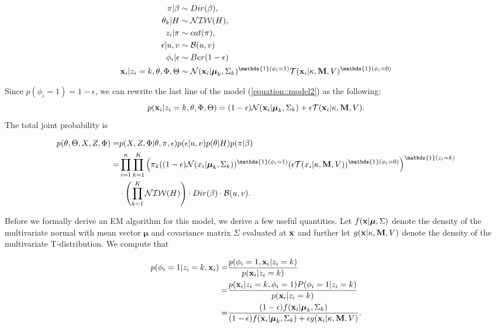\documentclass[12pt,english]{article}\usepackage[]{graphicx}\usepackage[]{color}
\begin{document}
\begin{equation}\label{equation::model2}
\begin{split}
\pi|\beta &\sim Dir(\beta),\\
\theta_k|H &\sim \mathcal{NIW}(H),\\
z_i|\pi & \sim cat(\pi), \\
\epsilon|u,v & \sim \mathcal{B}(u,v)  \\
\phi_i|\epsilon & \sim Ber(1-\epsilon) \\
{\bf x}_i|z_i = k,\theta, \Phi , \Theta & \sim \mathcal{N}({\bf x}_i|\boldsymbol{\mu}_k, \Sigma_k)^{\mathds{1}(\phi_i = 1)}\mathcal{T}({\bf x}_i|\kappa, {\bf M}, V)^{\mathds{1}(\phi_i = 0)}
\end{split}
\end{equation}

Since $p(\phi_i = 1) = 1-\epsilon$, we can rewrite the last line of
the model (\ref{equation::model2}) as the following:
\[p({\bf x}_i|z_i = k,\theta, \Phi , \Theta) = (1-\epsilon) \mathcal{N}({\bf x}_i|\boldsymbol{\mu}_k, \Sigma_k) + \epsilon \mathcal{T}({\bf x}_i|\kappa, {\bf M}, V).\]
The total joint probability is

\begin{equation}\label{equation::likelihood2}
\begin{split}
p(\theta,\Theta, X, Z, \Phi)  = &p(X,Z,\Phi|\theta,\pi, \epsilon)p(\epsilon|u,v)p(\theta|H)p(\pi|\beta)\\
=  & \prod_{i=1}^{n}\prod_{k=1}^{K}\left(\pi_k((1-\epsilon)\mathcal{N}(x_i|\boldsymbol{\mu}_k, \Sigma_k))^{\mathds{1}(\phi_i = 1)}(\epsilon \mathcal{T}(x_i|\kappa, {\bf M}, V))^{\mathds{1}(\phi_i = 0)}\right)^{\mathds{1}(z_i=k)}\\
&\cdot \left(\prod_{k=1}^{K}\mathcal{NIW}(H)\right)\cdot Dir(\beta)\cdot \mathcal{B}(u,v).
\end{split}
\end{equation}

Before we formally derive an EM algorithm for this model, we derive a
few useful quantities. Let $f({\bf x} | \boldsymbol{\mu}, \Sigma)$
denote the density of the multivariate normal with mean vector
$\boldsymbol{\mu}$ and covariance matrix $\Sigma$ evaluated at
${\bf x}$ and further let $g({\bf x} | \kappa, {\bf M}, V )$ denote
the density of the multivariate T-distribution. We compute that

\begin{equation}
\begin{split}
p(\phi_i = 1|z_i = k , {\bf x}_i ) = &\frac{p(\phi_i=1, {\bf x}_i|z_i = k)}{p({\bf x}_i|z_i = k)}\\
=  & \frac{p({\bf x}_i|z_i = k, \phi_i =1)P(\phi_i=1|z_i= k)}{p({\bf x}_i|z_i = k)}\\
=  &\frac{(1-\epsilon)f({\bf x}_i|\boldsymbol{\mu}_k, \Sigma_{k})}{(1-\epsilon) f({\bf x}_i|\boldsymbol{\mu}_k, \Sigma_k) + \epsilon g({\bf x}_i|\kappa, {\bf M}, V)}.
\end{split}
\end{equation}
\end{document}
